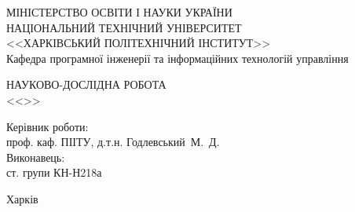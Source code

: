 \begin{titlepage}
	\vspace*{\fill} %
	
	\begin{framed}
		\begin{center}
			МІНІСТЕРСТВО ОСВІТИ І НАУКИ УКРАЇНИ \\
			НАЦІОНАЛЬНИЙ ТЕХНІЧНИЙ УНІВЕРСИТЕТ \\
			<<ХАРКІВСЬКИЙ ПОЛІТЕХНІЧНИЙ ІНСТИТУТ>> \\
			Кафедра програмної інженерії та інформаційних технологій управління
		\end{center}
	
		\begin{center}
			\MakeUppercase{Науково-дослідна робота} \\ 
			<<\thetitle>>
		\end{center}
	
		\noindent	
		Керівник роботи: \\
		\hspace*{\parindent} проф. каф. ПІІТУ, д.т.н. \hfill Годлевський~М.~Д. \\
		Виконавець: \\
		\hspace*{\parindent} ст. групи КН-Н218а \hfill \theauthor
	
		\begin{center}
			Харків \the\year
		\end{center}
	\end{framed}

	\vspace*{\fill} %
\end{titlepage}

